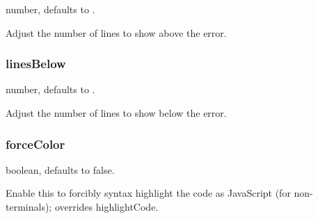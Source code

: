 {\ttfamily number}, defaults to {}.

Adjust the number of lines to show above the error.

\subsubsection*{{\ttfamily lines\+Below}}

{\ttfamily number}, defaults to {}.

Adjust the number of lines to show below the error.

\subsubsection*{{\ttfamily force\+Color}}

{\ttfamily boolean}, defaults to {\ttfamily false}.

Enable this to forcibly syntax highlight the code as Java\+Script (for non-\/terminals); overrides {\ttfamily highlight\+Code}. 